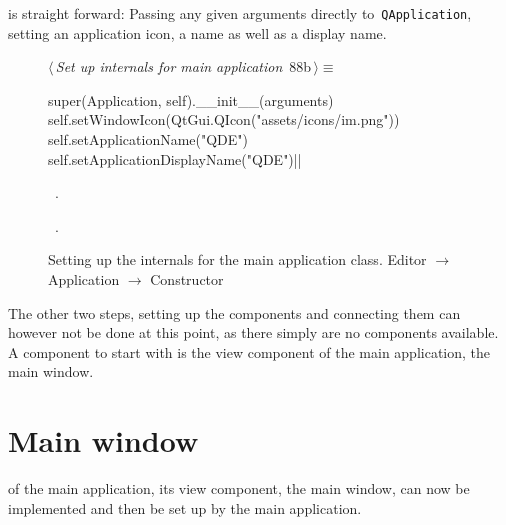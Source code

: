 \documentclass[%
    a4paper,    %
    justified,  %
    nobib,      %
    openany     %
]{tufte-book}
\makeatletter
\renewcommand{\label}[1]{\@tufte@label{##1}}%
\makeatother
\begin{document}
 is straight forward: Passing any given
arguments directly to~\verb=QApplication=, setting an application icon, a name
as well as a display name.

\begin{figure}[!htpb]
\begin{flushleft} \small
\begin{minipage}{\linewidth}\label{scrap14}\raggedright\small
{} $\langle\,${\itshape Set up internals for main application}\nobreak\ {\footnotesize {88b}}$\,\rangle\equiv$
\vspace{-1ex}
\begin{pythoncode}
super(Application, self).__init__(arguments)
self.setWindowIcon(QtGui.QIcon("assets/icons/im.png"))
self.setApplicationName("QDE")
self.setApplicationDisplayName("QDE")|\NWsep|
\end{pythoncode}
\vspace{1.5ex}
\footnotesize
\begin{list}{}{\setlength{\itemsep}{-\parsep}\setlength{\itemindent}{-\leftmargin}}
\item \NWtxtMacroDefBy\ .
\item \NWtxtMacroRefIn\ .

\item{}
\end{list}
\end{minipage}\vspace{4ex}
\end{flushleft}
\caption{Setting up the internals for the main application class.
  \newline{}\newline{}Editor $\rightarrow$ Application $\rightarrow$
  Constructor}
\end{figure}

The other two steps, setting up the components and connecting them can however
not be done at this point, as there simply are no components available. A
component to start with is the view component of the main application, the main
window.

\section{Main window}
\label{appendix:sec:editor:main-window}

 of the main application, its
view component, the main window, can now be implemented and then be set up by
the main application.
\end{document}
